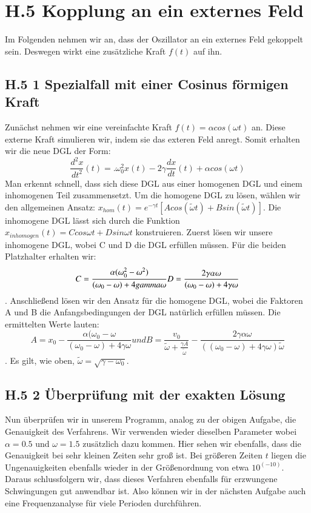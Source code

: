 \documentclass[ngerman]{scrartcl}
\begin{document}
\section{H.5 Kopplung an ein externes Feld}
Im Folgenden nehmen wir an, dass der Oszillator an ein externes Feld gekoppelt sein. Deswegen wirkt eine zusätzliche Kraft $f(t)$ auf ihn. 
\subsection{H.5 1 Spezialfall mit einer Cosinus förmigen Kraft}
Zunächst nehmen wir eine vereinfachte Kraft $f(t)=\alpha cos(\omega t)$ an. Diese externe Kraft simulieren wir, indem sie das exteren Feld anregt. Somit erhalten wir die neue DGL der Form:
\begin{equation} \frac{d^2x}{dt^2}(t)=.\omega^2_0 x(t) -2\gamma \frac{dx}{dt}(t)+\alpha cos(\omega t) \end{equation}
Man erkennt schnell, dass sich diese DGL aus einer homogenen DGL und einem inhomogenen Teil zusammensetzt. Um die homogene DGL zu lösen, wählen wir den allgemeinen Ansatz: $x_{hom}(t)=e^{-\gamma t}[A cos(\tilde{\omega}t)+B sin(\tilde{\omega}t)]$. Die inhomogene DGL lässt sich durch die Funktion $x _{inhomogen}(t)=C cos{\omega t}+D sin{\omega t}$ konstruieren. Zuerst lösen wir unsere inhomogene DGL, wobei C und D die DGL erfüllen müssen. Für die beiden Platzhalter erhalten wir: 
\begin{equation*} C=\frac{\alpha(\omega^2_0 - \omega^2)}{(\omega_0-\omega)+4gamma\omega} \newline D=\frac{2\gamma\alpha\omega}{(\omega_0-\omega)+4\gamma\omega} \end{equation*}. Anschließend lösen wir den Ansatz für die homogene DGL, wobei die Faktoren A und B die Anfangsbedingungen der DGL natürlich erfüllen müssen. Die ermittelten Werte lauten: 
\begin{equation*} A=x_0-\frac{\alpha(\omega_0-\omega}{(\omega_0-\omega)+4\gamma\omega} und B=\frac{v_0}{{\tilde{\omega}}+\frac{\gamma A}{\tilde{\omega}}}-\frac{2\gamma\alpha\omega}{((\omega_0-\omega)+4\gamma\omega)\tilde{\omega}} \end{equation*}. 
Es gilt, wie oben, $\tilde{\omega}= \sqrt{\gamma-\omega_0}$. 

\subsection{H.5 2 Überprüfung mit der exakten Lösung}
Nun überprüfen wir in unserem Programm, analog zu der obigen Aufgabe, die Genauigkeit des Verfahrens.  Wir verwenden wieder dieselben Parameter wobei $\alpha=0.5$ und $\omega=1.5$ zusätzlich dazu kommen. Hier sehen wir ebenfalls, dass die Genauigkeit bei sehr kleinen Zeiten sehr groß ist. Bei größeren Zeiten $t$ liegen die Ungenauigkeiten ebenfalls wieder in der Größenordnung von etwa $10^(-10)$. Daraus schlussfolgern wir, dass dieses Verfahren ebenfalls für erzwungene Schwingungen gut anwendbar ist. Also können wir in der nächsten Aufgabe auch eine Frequenzanalyse für viele Perioden durchführen.
\end{document}
